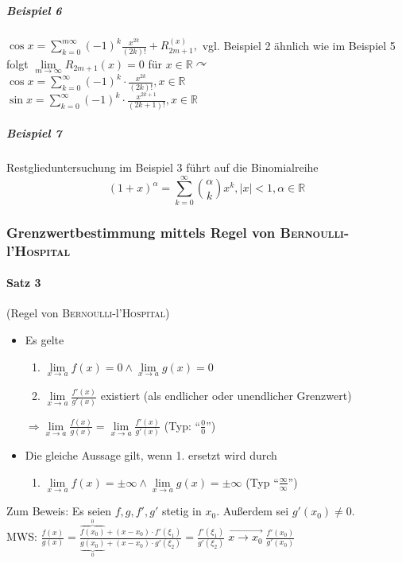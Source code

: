 \documentclass[a4paper]{scrartcl}
\begin{document}
\subparagraph{Beispiel 6} $\cos{x} = \sum\limits_{k=0}^{m\infty} (-1)^k \frac{x^{2k}}{(2k)!} + R_{2m+1}^{(x)},$ vgl. Beispiel 2 ähnlich wie im Beispiel 5 folgt $\lim\limits_{m\to \infty} R_{2m+1} (x) = 0$ für $x \in \mathbb{R} \curvearrowright$\\
$\cos{x} = \sum\limits_{k=0}^{\infty} (-1)^k \cdot \frac{x^{2k}}{(2k)!}, x\in \mathbb{R}$\\
$\sin{x} = \sum\limits_{k=0}^{\infty} (-1)^k \cdot \frac{x^{2k+1}}{(2k+1)!}, x \in \mathbb{R}$

\subparagraph{Beispiel 7} Restglieduntersuchung im Beispiel 3 führt auf die Binomialreihe
\[(1+x)^\alpha = \sum\limits_{k=0}^{\infty} \binom{\alpha}{k} x^k, \lvert x \rvert < 1, \alpha \in \mathbb{R}\]

\subsubsection{Grenzwertbestimmung mittels Regel von \textsc{Bernoulli}-l'\textsc{Hospital}}
\paragraph{Satz 3} (Regel von \textsc{Bernoulli}-l'\textsc{Hospital})
\begin{itemize}
\item Es gelte
\begin{enumerate}
\item $\lim\limits_{x\to a} f(x) = 0 \wedge \lim\limits_{x \to a} g(x)  = 0$
\item $\lim\limits_{x \to a} \frac{f'(x)}{g'(x)}$ existiert (als endlicher oder unendlicher Grenzwert)
\end{enumerate}
$\Rightarrow \lim\limits_{x \to a} \frac{f(x)}{g(x)} = \lim\limits_{x \to a} \frac{f'(x)}{g'(x)}$ (Typ: "`$\frac{0}{0}$"')
\item Die gleiche Aussage gilt, wenn 1. ersetzt wird durch 
\begin{enumerate}
\item $\lim\limits_{x \to a} f(x) = \pm \infty \wedge \lim\limits_{x \to a} g(x) = \pm \infty$ (Typ "`$\frac{\infty}{\infty}$"')
\end{enumerate}
\end{itemize}

Zum Beweis: Es seien $f,g,f',g'$ stetig in $x_0$. Außerdem sei $g'(x_0) \neq 0$.\\
MWS: $\frac{f(x)}{g(x)} = \frac{\overbrace{f(x_0)}^{0} + (x-x_0) \cdot f'(\xi_1)}{\underbrace{g(x_0)}_{0} + (x-x_0) \cdot g'(\xi_2)} = \frac{f'(\xi_1)}{g'(\xi_2)} \; \overrightarrow{x \to x_0} \; \frac{f'(x_0)}{g'(x_0)}$
\end{document}
